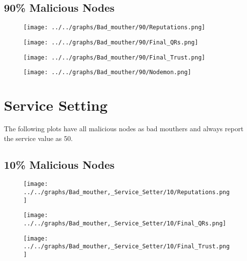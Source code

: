 \begin{minipage}[t]{0.49\columnwidth}
\subsection*{90\% Malicious Nodes}
    \begin{figure}[H]
        \centering
        \texttt{[image: ../../graphs/Bad\_mouther/90/Reputations.png]}
    \end{figure}
    \begin{figure}[H]
        \centering
        \texttt{[image: ../../graphs/Bad\_mouther/90/Final\_QRs.png]}
    \end{figure}
\end{minipage}
\begin{minipage}[t]{0.49\columnwidth}
    \begin{figure}[H]
        \centering
        \texttt{[image: ../../graphs/Bad\_mouther/90/Final\_Trust.png]}
    \end{figure}
    \begin{figure}[H]
        \centering
        \texttt{[image: ../../graphs/Bad\_mouther/90/Nodemon.png]}
    \end{figure}
\end{minipage}
\newpage

\section*{Service Setting}
The following plots have all malicious nodes as bad mouthers and always
report the service value as 50.
\\
\begin{minipage}[t]{0.49\columnwidth}
\subsection*{10\% Malicious Nodes}
    \begin{figure}[H]
        \centering
        \texttt{[image: ../../graphs/Bad\_mouther,\_Service\_Setter/10/Reputations.png]}
    \end{figure}
    \begin{figure}[H]
        \centering
        \texttt{[image: ../../graphs/Bad\_mouther,\_Service\_Setter/10/Final\_QRs.png]}
    \end{figure}
\end{minipage}
\begin{minipage}[t]{0.49\columnwidth}
    \begin{figure}[H]
        \centering
        \texttt{[image: ../../graphs/Bad\_mouther,\_Service\_Setter/10/Final\_Trust.png]}
    \end{figure}
\end{minipage}

